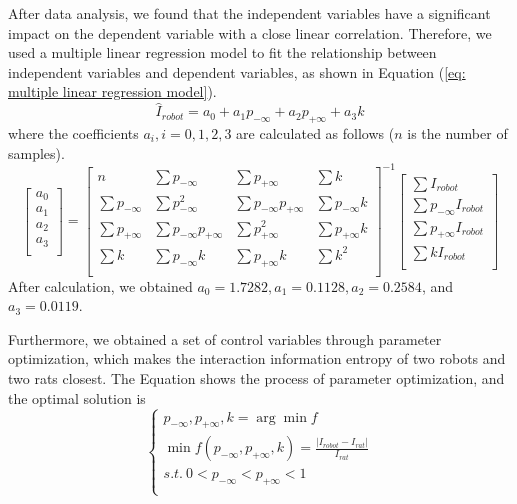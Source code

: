 After data analysis, we found that the independent variables have a significant
impact on the dependent variable with a close linear correlation. Therefore, we
used a multiple linear regression model to fit the relationship between
independent variables and dependent variables, as shown in Equation (\ref{eq:
multiple linear regression model}).
\begin{equation}\label{eq:multiple linear regression model}
    \hat{I}_{robot}=a_0+a_1p_{-\infty}+a_2p_{+\infty}+a_3k
\end{equation}
where the coefficients $a_i, i=0,1,2,3$ are calculated as follows ($n$ is the number of samples).
\begin{equation*}
    \left[\begin{array}{c}
        a_0 \\
        a_1 \\
        a_2 \\
        a_3 \\
    \end{array}\right]=\left[\begin{array}{cccc}
        n & \sum p_{-\infty} & \sum p_{+\infty}  & \sum k \\
        \sum p_{-\infty} & \sum p^2_{-\infty} & \sum p_{-\infty}p_{+\infty}  &
        \sum p_{-\infty} k \\
        \sum p_{+\infty} & \sum p_{-\infty} p_{+\infty} & \sum p^2_{+\infty}  &
        \sum p_{+\infty} k \\
        \sum k & \sum p_{-\infty} k & \sum p_{+\infty} k  & \sum k^2 \\
    \end{array}\right]^{-1}
    \left[\begin{array}{c}
        \sum I_{robot} \\
        \sum p_{-\infty} I_{robot} \\
        \sum p_{+\infty} I_{robot} \\
        \sum kI_{robot} \\
    \end{array}\right]
\end{equation*}
After calculation, we obtained $a_0=1.7282, a_1=0.1128, a_2=0.2584$, and $
a_3=0.0119$.

Furthermore, we obtained a set of control variables through parameter
optimization, which makes the interaction information entropy of two robots and
two rats closest. The Equation shows the process of parameter optimization, and
the optimal solution is
\begin{equation}
    \begin{cases}
        p_{-\infty},p_{+\infty},k=\arg\min f \\
        \min f(p_{-\infty},p_{+\infty},k)=\displaystyle\frac{|I_{robot}-I_{rat}|}
        {I_{rat}} \\
        s.t.~0<p_{-\infty}<p_{+\infty}<1 \\
    \end{cases}
\end{equation}

